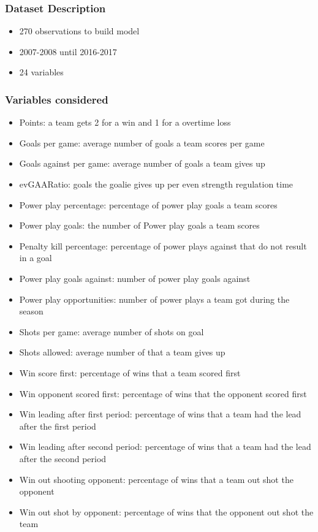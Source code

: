 \documentclass{beamer}
\begin{document}
\begin{frame}
\frametitle{Dataset Description}
	\begin{itemize}
	\item 270 observations to build model
	\item 2007-2008 until 2016-2017 
	\item 24 variables
	\end{itemize}
\end{frame}
\begin{frame}
	\frametitle{Variables considered}
	\begin{itemize}
		\item Points: a team gets 2 for a win and 1 for a overtime loss
		\item Goals per game: average number of goals a team scores per game
		\item Goals against per game: average number of goals a team gives up 
		\item evGAARatio: goals the goalie gives up per even strength regulation time
		\item Power play percentage: percentage of power play goals a team scores
		\item Power play goals: the number of Power play goals a team scores
	\end{itemize}
\end{frame}
	\begin{frame}
	\begin{itemize}
	\item Penalty kill percentage: percentage of power plays against that do not result in a goal
	\item Power play goals against: number of power play goals against
	\item Power play opportunities: number of power plays a team got during the season
	\item Shots per game: average number of shots on goal
	\item Shots allowed: average number of that a team gives up
\end{itemize}
\end{frame}
\begin{frame}
	\begin{itemize}
		\item Win score first: percentage of wins that a team scored first
		\item Win opponent scored first: percentage of wins that the opponent scored first
		\item Win leading after first period: percentage of wins that a team had the lead after the first period
		\item Win leading after second period: percentage of wins that a team had the lead after the second period
		\item Win out shooting opponent: percentage of wins that a team out shot the opponent
		\item Win out shot by opponent: percentage of wins that the opponent out shot the team
	\end{itemize}
\end{frame}
\end{document}
